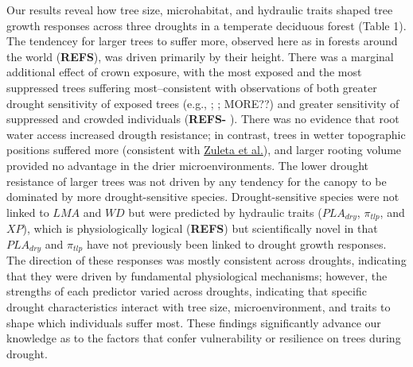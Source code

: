 \documentclass[]{article}
\begin{document}
Our results reveal how tree size, microhabitat, and hydraulic traits
shaped tree growth responses across three droughts in a temperate
deciduous forest (Table 1). The tendencey for larger trees to suffer
more, observed here as in forests around the world (\textbf{REFS}), was
driven primarily by their height. There was a marginal additional effect
of crown exposure, with the most exposed and the most suppressed trees
suffering most--consistent with observations of both greater drought
sensitivity of exposed trees (e.g., \citep{suarez_factors_2004};
\citep{scharnweber_confessions_2019}; MORE??) and greater sensitivity of
suppressed and crowded individuals (\textbf{REFS- }). There was no
evidence that root water access increased drougth resistance; in
contrast, trees in wetter topographic positions suffered more
(consistent with
\href{https://repository.si.edu/bitstream/handle/10088/32814/Zuleta-et-al_2017_Ecology.pdf?sequence=1\&isAllowed=y}{Zuleta
et al.}), and larger rooting volume provided no advantage in the drier
microenvironments. The lower drought resistance of larger trees was not
driven by any tendency for the canopy to be dominated by more
drought-sensitive species. Drought-sensitive species were not linked to
\(LMA\) and \(WD\) but were predicted by hydraulic traits
(\(PLA_{dry}\), \(\pi_{tlp}\), and \(XP\)), which is physiologically
logical (\textbf{REFS}\citep{kannenberg_linking_2019}) but
scientifically novel in that \(PLA_{dry}\) and \(\pi_{tlp}\) have not
previously been linked to drought growth responses. The direction of
these responses was mostly consistent across droughts, indicating that
they were driven by fundamental physiological mechanisms; however, the
strengths of each predictor varied across droughts, indicating that
specific drought characteristics interact with tree size,
microenvironment, and traits to shape which individuals suffer most.
These findings significantly advance our knowledge as to the factors
that confer vulnerability or resilience on trees during drought.
\end{document}
